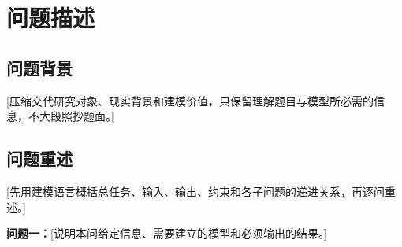 \section{问题描述}

\subsection{问题背景}

[压缩交代研究对象、现实背景和建模价值，只保留理解题目与模型所必需的信息，不大段照抄题面。]

\subsection{问题重述}

[先用建模语言概括总任务、输入、输出、约束和各子问题的递进关系，再逐问重述。]

\noindent\textbf{问题一：}[说明本问给定信息、需要建立的模型和必须输出的结果。]
